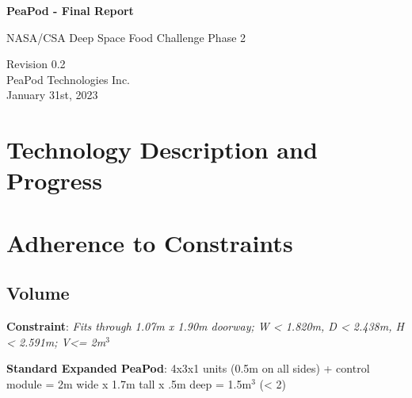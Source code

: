 \documentclass{../tex/report}
\begin{document}
\begin{titlepage}
    \begin{center}
        \vspace*{1.2cm}

        \textbf{\large{PeaPod - Final Report}}

        \vspace{0.5cm}

        NASA/CSA Deep Space Food Challenge Phase 2

        \vfill
        
        \vspace{.75cm}

        Revision 0.2\\
        PeaPod Technologies Inc.\\
        January 31st, 2023

    \end{center}
\end{titlepage}

\thispagestyle{plain}

\tableofcontents
\newpage

\section{Technology Description and Progress}




\section{Adherence to Constraints}

\subsection{Volume}

\textbf{Constraint}: \textit{Fits through 1.07m x 1.90m doorway; W < 1.820m, D < 2.438m, H < 2.591m; V<= 2m${}^3$}

\textbf{Standard Expanded PeaPod}: 4x3x1 units (0.5m on all sides) + control module = 2m wide x 1.7m tall x .5m deep = 1.5m${}^3$ (< 2)
\end{document}
